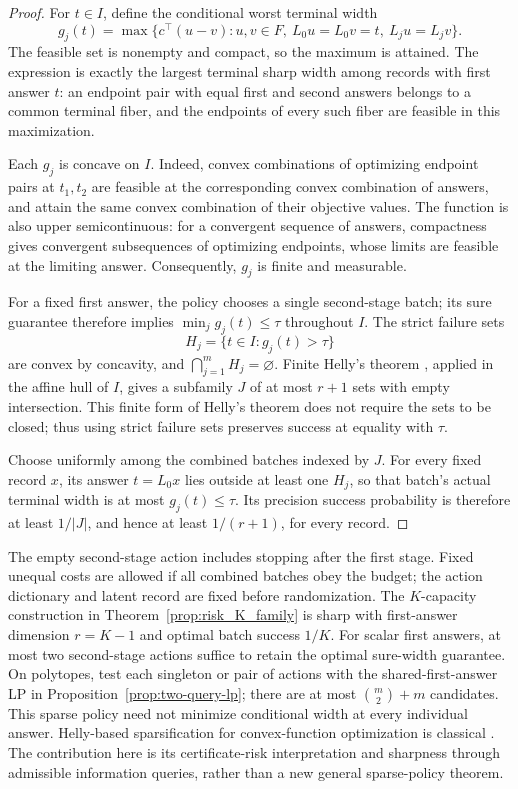 \documentclass[12pt]{article}
\begin{document}
\begin{proof}
For $t\in I$, define the conditional worst terminal width
\[
 g_j(t)=\max\{c^\top(u-v):u,v\in F,\ L_0u=L_0v=t,
                                      \ L_ju=L_jv\}.
\]
The feasible set is nonempty and compact, so the maximum is attained.
The expression is exactly the largest terminal sharp width among records
with first answer $t$: an endpoint pair with equal first and second
answers belongs to a common terminal fiber, and the endpoints of every
such fiber are feasible in this maximization.

Each $g_j$ is concave on $I$. Indeed, convex combinations of optimizing
endpoint pairs at $t_1,t_2$ are feasible at the corresponding convex
combination of answers, and attain the same convex combination of their
objective values. The function is also upper semicontinuous: for a
convergent sequence of answers, compactness gives convergent subsequences
of optimizing endpoints, whose limits are feasible at the limiting
answer. Consequently, $g_j$ is finite and measurable.

For a fixed first answer, the policy chooses a single second-stage batch;
its sure guarantee therefore implies $\min_jg_j(t)\leq\tau$ throughout
$I$. The strict failure sets
\[
 H_j=\{t\in I:g_j(t)>\tau\}
\]
are convex by concavity, and $\bigcap_{j=1}^m H_j=\varnothing$.
Finite Helly's theorem \citep[Theorem~1.1]{amenta2016}, applied in the affine hull of $I$, gives a
subfamily $J$ of at most $r+1$ sets with empty intersection. This finite
form of Helly's theorem does not require the sets to be closed; thus
using strict failure sets preserves success at equality with $\tau$.

Choose uniformly among the combined batches indexed by $J$. For every
fixed record $x$, its answer $t=L_0x$ lies outside at least one $H_j$,
so that batch's actual terminal width is at most $g_j(t)\leq\tau$.
Its precision success probability is therefore at least $1/|J|$, and
hence at least $1/(r+1)$, for every record.
\end{proof}


The empty second-stage action includes stopping after the first stage.
Fixed unequal costs are allowed if all combined batches obey the budget;
the action dictionary and latent record are fixed before randomization.
The $K$-capacity construction in Theorem~\ref{prop:risk_K_family} is sharp
with first-answer dimension $r=K-1$ and optimal batch success $1/K$.
For scalar first answers, at most two second-stage actions suffice to
retain the optimal sure-width guarantee. On polytopes, test each singleton
or pair of actions with the shared-first-answer LP in
Proposition~\ref{prop:two-query-lp}; there are at most
$\binom m2+m$ candidates. This sparse policy need not minimize conditional
width at every individual answer. Helly-based sparsification for
convex-function optimization is classical
\citep[Section~2, Theorem~1]{rockafellar1965}. The contribution here is
its certificate-risk interpretation and sharpness through admissible
information queries, rather than a new general sparse-policy theorem.
\end{document}
